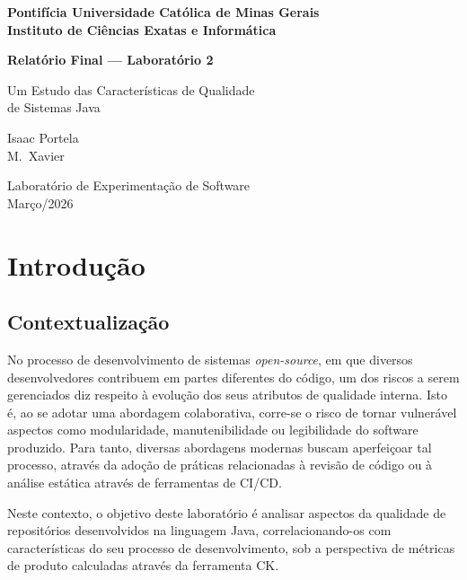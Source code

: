 \documentclass[12pt,a4paper]{article}
\begin{document}
\begin{titlepage}
\centering
\vspace*{2cm}

{\Large\bfseries Pontifícia Universidade Católica de Minas Gerais\\[4pt]
Instituto de Ciências Exatas e Informática}

\vspace{3cm}

{\LARGE\bfseries Relatório Final — Laboratório 2}

\vspace{1cm}

{\Large Um Estudo das Características de Qualidade\\de Sistemas Java}

\vspace{3cm}

{\large
Isaac Portela\\
M.\ Xavier
}

\vfill

{\large
Laboratório de Experimentação de Software\\
Março/2026
}

\end{titlepage}

\tableofcontents
\newpage

\section{Introdução}

\subsection{Contextualização}

No processo de desenvolvimento de sistemas \textit{open-source}, em que diversos desenvolvedores contribuem em partes diferentes do código, um dos riscos a serem gerenciados diz respeito à evolução dos seus atributos de qualidade interna. Isto é, ao se adotar uma abordagem colaborativa, corre-se o risco de tornar vulnerável aspectos como modularidade, manutenibilidade ou legibilidade do software produzido. Para tanto, diversas abordagens modernas buscam aperfeiçoar tal processo, através da adoção de práticas relacionadas à revisão de código ou à análise estática através de ferramentas de CI/CD.

Neste contexto, o objetivo deste laboratório é analisar aspectos da qualidade de repositórios desenvolvidos na linguagem Java, correlacionando-os com características do seu processo de desenvolvimento, sob a perspectiva de métricas de produto calculadas através da ferramenta CK.
\end{document}
